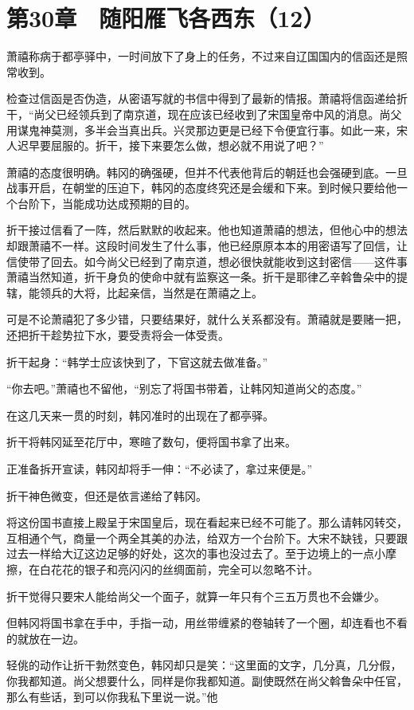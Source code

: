 \section{第30章　随阳雁飞各西东（12）}

萧禧称病于都亭驿中，一时间放下了身上的任务，不过来自辽国国内的信函还是照常收到。

检查过信函是否伪造，从密语写就的书信中得到了最新的情报。萧禧将信函递给折干，“尚父已经领兵到了南京道，现在应该已经收到了宋国皇帝中风的消息。尚父用谋鬼神莫测，多半会当真出兵。兴灵那边更是已经下令便宜行事。如此一来，宋人迟早要屈服的。折干，接下来要怎么做，想必就不用说了吧？”

萧禧的态度很明确。韩冈的确强硬，但并不代表他背后的朝廷也会强硬到底。一旦战事开启，在朝堂的压迫下，韩冈的态度终究还是会缓和下来。到时候只要给他一个台阶下，当能成功达成预期的目的。

折干接过信看了一阵，然后默默的收起来。他也知道萧禧的想法，但他心中的想法却跟萧禧不一样。这段时间发生了什么事，他已经原原本本的用密语写了回信，让信使带了回去。如今尚父已经到了南京道，想必很快就能收到这封密信——这件事萧禧当然知道，折干身负的使命中就有监察这一条。折干是耶律乙辛斡鲁朵中的提辖，能领兵的大将，比起亲信，当然是在萧禧之上。

可是不论萧禧犯了多少错，只要结果好，就什么关系都没有。萧禧就是要赌一把，还把折干趁势拉下水，要受责将会一体受责。

折干起身：“韩学士应该快到了，下官这就去做准备。”

“你去吧。”萧禧也不留他，“别忘了将国书带着，让韩冈知道尚父的态度。”

在这几天来一贯的时刻，韩冈准时的出现在了都亭驿。

折干将韩冈延至花厅中，寒暄了数句，便将国书拿了出来。

正准备拆开宣读，韩冈却将手一伸：“不必读了，拿过来便是。”

折干神色微变，但还是依言递给了韩冈。

将这份国书直接上殿呈于宋国皇后，现在看起来已经不可能了。那么请韩冈转交，互相通个气，商量一个两全其美的办法，给双方一个台阶下。大宋不缺钱，只要跟过去一样给大辽这边足够的好处，这次的事也没过去了。至于边境上的一点小摩擦，在白花花的银子和亮闪闪的丝绸面前，完全可以忽略不计。

折干觉得只要宋人能给尚父一个面子，就算一年只有个三五万贯也不会嫌少。

但韩冈将国书拿在手中，手指一动，用丝带缠紧的卷轴转了一个圈，却连看也不看的就放在一边。

轻佻的动作让折干勃然变色，韩冈却只是笑：“这里面的文字，几分真，几分假，你我都知道。尚父想要什么，同样是你我都知道。副使既然在尚父斡鲁朵中任官，那么有些话，到可以你我私下里说一说。”他

